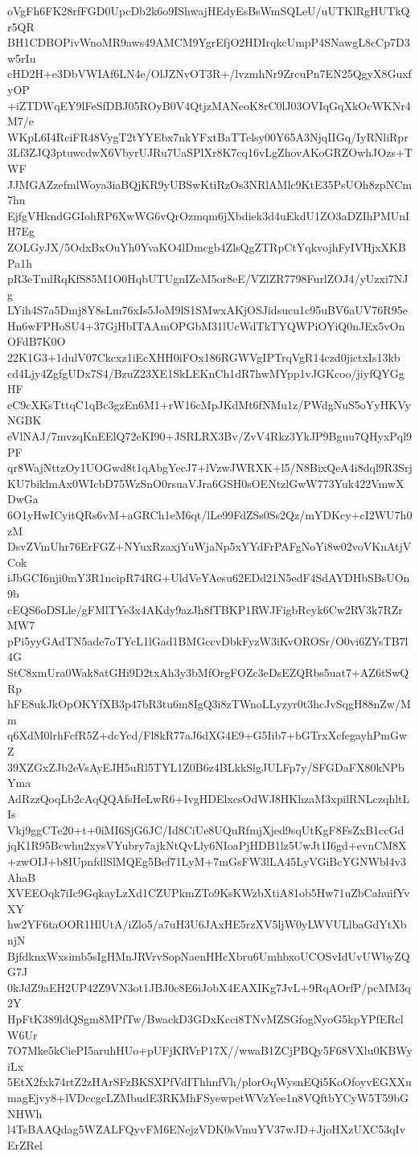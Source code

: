 oVgFh6FK28rfFGD0UpcDb2k6o9IShwajHEdyEsBsWmSQLeU/uUTKlRgHUTkQr5QR
BH1CDBOPivWnoMR9aws49AMCM9YgrEfjO2HDIrqkcUmpP4SNawgL8cCp7D3w5rIu
cHD2H+e3DbVWIAf6LN4e/OlJZNvOT3R+/lvzmhNr9ZrcuPn7EN25QgyX8GuxfyOP
+iZTDWqEY9lFeSfDBJ05ROyB0V4QtjzMANeoK8rC0lJ03OVIqGqXkOcWKNr4M7/e
WKpL6I4RciFR48VygT2tYYEbx7nkYFxtBaTTelsy00Y65A3NjqIIGq/IyRNliRpr
3Lf3ZJQ3ptuwcdwX6VbyrUJRu7UaSPlXr8K7cq16vLgZhovAKoGRZOwhJOzs+TWF
JJMGAZzefmlWoya3iaBQjKR9yUBSwKtiRzOs3NRlAMlc9KtE35PsUOh8zpNCm7hn
EjfgVHkndGGIohRP6XwWG6vQrOzmqm6jXbdiek3d4uEkdU1ZO3aDZIhPMUnIH7Eg
ZOLGyJX/5OdxBxOuYh0YvaKO4lDmcgb4ZlsQgZTRpCtYqkvojhFyIVHjxXKBPa1h
pR3eTmlRqKfS85M1O0HqbUTUgnIZcM5or8eE/VZlZR7798FurlZOJ4/yUzxi7NJg
LYih4S7a5Dmj8Y8sLm76xIs5JoM9lS1SMwxAKjOSJidsucu1c95uBV6aUV76R95e
Hn6wFPHoSU4+37GjHbITAAmOPGbM31lUcWdTkTYQWPiOYiQ0nJEx5vOnOFdB7K0O
22K1G3+1dulV07Ckcxz1iEcXHH0iFOx186RGWVgIPTrqVgR14czd0jictxIs13kb
cd4Ljy4ZgfgUDx7S4/BzuZ23XE1SkLEKnCh1dR7hwMYpp1vJGKcoo/jiyfQYGgHF
eC9cXKsTttqC1qBc3gzEn6M1+rW16cMpJKdMt6fNMu1z/PWdgNuS5oYyHKVyNGBK
eVlNAJ/7mvzqKnEElQ72eKI90+JSRLRX3Bv/ZvV4Rkz3YkJP9Bguu7QHyxPql9PF
qr8WajNttzOy1UOGwd8t1qAbgYecJ7+lVzwJWRXK+l5/N8BixQeA4i8dql9R3Srj
KU7biklmAx0WIcbD75WzSnO0rsuaVJra6GSH0sOENtzlGwW773Yuk422VmwXDwGa
6O1yHwICyitQRs6vM+aGRCh1eM6qt/lLe99FdZSs0Ss2Qz/mYDKcy+cI2WU7h0zM
DsvZVmUhr76ErFGZ+NYuxRzaxjYuWjaNp5xYYdFrPAFgNoYi8w02voVKnAtjVCok
iJbGCI6nji0mY3R1ncipR74RG+UldVeYAesu62EDd21N5edF4SdAYDHbSBsUOn9b
cEQS6oDSLle/gFMlTYe3x4AKdy9azJh8fTBKP1RWJFigbRcyk6Cw2RV3k7RZrMW7
pPi5yyGAdTN5ade7oTYcL1lGad1BMGccvDbkFyzW3iKvOROSr/O0vi6ZYsTB7l4G
StC8xmUra0Wak8atGHi9D2txAh3y3bMfOrgFOZc3eDsEZQRbs5uat7+AZ6tSwQRp
hFE8ukJkOpOKYfXB3p47bR3tu6m8IgQ3i8zTWnoLLyzyr0t3hcJvSqgH88nZw/Mm
q6XdM0lrhFcfR5Z+dcYcd/Fl8kR77aJ6dXG4E9+G5Iib7+bGTrxXcfegayhPmGwZ
39XZGxZJb2eVsAyEJH5uRl5TYL1Z0B6z4BLkkSlgJULFp7y/SFGDaFX80kNPbYma
AdRzzQoqLb2cAqQQAfsHeLwR6+IvgHDElxcsOdWJ8HKhzaM3xpilRNLczqhltLIs
Vkj9ggCTe20+t+0iMI6SjG6JC/Id8CiUe8UQuRfmjXjed9sqUtKgF8FsZxB1ccGd
jqK1R95Bcwhu2xysVYubry7ajkNtQvLly6NIoaPjHDB1lz5UwJt1I6gd+evnCM8X
+zwOIJ+b8IUpnfdlSlMQEg5Bef71LyM+7mGsFW3lLA45LyVGiBcYGNWbl4v3AhaB
XVEEOqk7iIc9GqkayLzXd1CZUPkmZTo9KsKWzbXtiA81ob5Hw71uZbCahuifYvXY
hw2YF6taOOR1HlUtA/iZlo5/a7uH3U6JAxHE5rzXV5ljW0yLWVULlbaGdYtXbnjN
BjfdknxWxsimb5sIgHMnJRVrvSopNaenHHcXbru6UmhbxoUCOSvIdUvUWbyZQG7J
0kJdZ9aEH2UP42Z9VN3ot1JBJ0c8E6iJobX4EAXIKg7JvL+9RqAOrfP/pcMM3q2Y
HpFtK389ldQSgm8MPfTw/BwackD3GDxKcci8TNvMZSGfogNyoG5kpYPfERclW6Ur
7O7Mke5kCiePI5aruhHUo+pUFjKRVrP17X//wwaB1ZCjPBQy5F68VXlu0KBWyiLx
5EtX2fxk74rtZ2zHArSFzBKSXPfVdIThhnfVh/plorOqWysnEQi5KoOfoyvEGXXu
magEjvy8+lVDccgcLZMbudE3RKMhFSyewpetWVzYee1n8VQftbYCyW5T59bGNHWh
l4TsBAAQdag5WZALFQyvFM6ENejzVDK0sVmuYV37wJD+JjoHXzUXC53qIvErZRel
